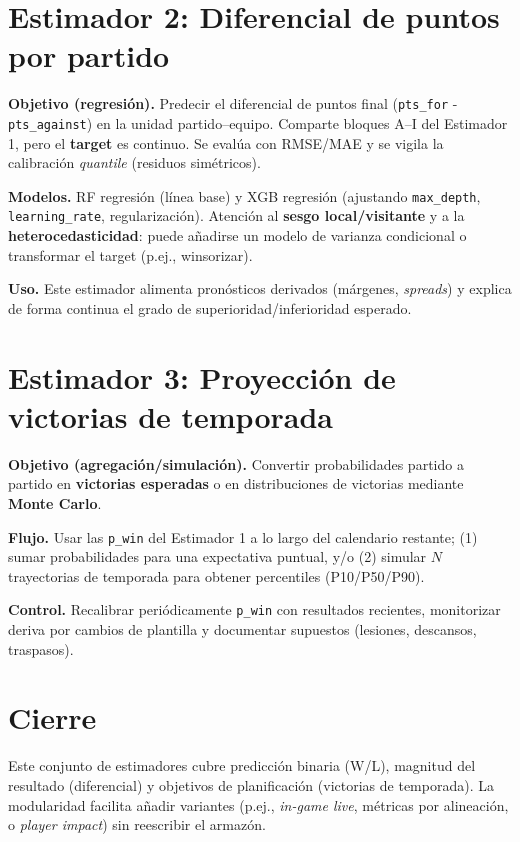 \section{Estimador 2: Diferencial de puntos por partido}\label{sec:estimador2}
\textbf{Objetivo (regresión).} Predecir el diferencial de puntos final (\texttt{pts\_for} - \texttt{pts\_against}) en la unidad partido–equipo. 
Comparte bloques A–I del Estimador 1, pero el \textbf{target} es continuo. 
Se evalúa con RMSE/MAE y se vigila la calibración \textit{quantile} (residuos simétricos).

\textbf{Modelos.} RF regresión (línea base) y XGB regresión (ajustando \texttt{max\_depth}, \texttt{learning\_rate}, regularización).
Atención al \textbf{sesgo local/visitante} y a la \textbf{heterocedasticidad}: 
puede añadirse un modelo de varianza condicional o transformar el target (p.ej., winsorizar).

\textbf{Uso.} Este estimador alimenta pronósticos derivados (márgenes, \textit{spreads}) y explica de forma continua el grado de superioridad/inferioridad esperado.

\section{Estimador 3: Proyección de victorias de temporada}\label{sec:estimador3}
\textbf{Objetivo (agregación/simulación).} Convertir probabilidades partido a partido en \textbf{victorias esperadas} o 
en distribuciones de victorias mediante \textbf{Monte Carlo}. 

\textbf{Flujo.} Usar las \texttt{p\_win} del Estimador 1 a lo largo del calendario restante; 
(1) sumar probabilidades para una expectativa puntual, y/o (2) simular $N$ trayectorias de temporada para obtener percentiles (P10/P50/P90).

\textbf{Control.} Recalibrar periódicamente \texttt{p\_win} con resultados recientes, 
monitorizar deriva por cambios de plantilla y documentar supuestos (lesiones, descansos, traspasos).

\section{Cierre}
Este conjunto de estimadores cubre predicción binaria (W/L), magnitud del resultado (diferencial) y objetivos de planificación (victorias de temporada).
La modularidad facilita añadir variantes (p.ej., \textit{in-game live}, métricas por alineación, o \textit{player impact}) sin reescribir el armazón.
